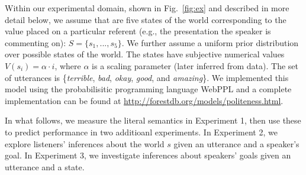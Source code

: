 \documentclass[10pt,letterpaper]{article}
\newcommand{\denote}[1]{\mbox{ $[\![ #1 ]\!]$}}
\newcommand{\mht}[1]{\textcolor{DarkOrange}{[mht: #1]}}
\newcommand{\ejy}[1]{\textcolor{Blue}{[ejy: #1]}}
\begin{document}
%

Within our experimental domain, shown in Fig.~\ref{fig:ex} and described in more detail below, we assume that are five states of the world corresponding to the value placed on a particular referent (e.g., the presentation the speaker is commenting on): $S = \{s_{1}, ...,  s_{5}\}$.
We further assume a uniform prior distribution over possible states of the world.
The states have subjective numerical values $V(s_{i}) = \alpha \cdot i$, where $\alpha$ is a scaling parameter (later inferred from data).
The set of utterances is \{\emph{terrible}, \emph{bad}, \emph{okay}, \emph{good}, and \emph{amazing}\}.
We implemented this model using the probabilisitic programming language WebPPL \cite{dippl} and a complete implementation can be found at \url{http://forestdb.org/models/politeness.html}.

In what follows, we measure the literal semantics in Experiment 1, then use these to predict performance in two additioanl experiments. In Experiment 2, we explore listeners' inferences about the world $s$ given an utterance and a speaker's goal. In Experiment 3, we investigate inferences about speakers' goals given an utterance and a state.
\end{document}
